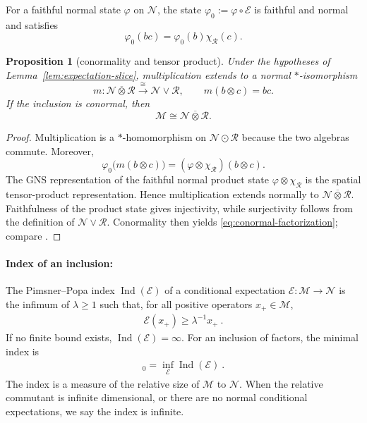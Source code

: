 \documentclass[a4paper,11pt]{article}
\newtheorem{proposition}[theorem]{Proposition}
\theoremstyle{definition}
\newcommand{\mR}{\mathcal{R}}
\newcommand{\mN}{\mathcal{N}}
\newcommand{\mM}{\mathcal{M}}
\newcommand{\mE}{\mathcal{E}}
\begin{document}
For a faithful normal state $\varphi$ on $\mN$, the state
$\varphi_0:=\varphi\circ \mE$ is faithful and normal and satisfies
\begin{equation}
 \varphi_0(b c)=\varphi_0(b)\chi_{\mR}(c).
\end{equation}

\begin{proposition}[conormality and tensor product]\label{prop:conormal-factorization}
Under the hypotheses of Lemma~\ref{lem:expectation-slice}, multiplication
extends to a normal $*$-isomorphism
\begin{equation}
 m:\mN\overline\otimes\mR
 \overset{\cong}{\longrightarrow}\mN\vee\mR,
 \qquad m(b\otimes c)=b c.
\end{equation}
If the inclusion is conormal, then
\begin{equation}\label{eq:conormal-factorization}
\mM\cong
 \mN\overline\otimes\mR .
\end{equation}
\end{proposition}

\begin{proof}
Multiplication is a $*$-homomorphism on $\mN\odot\mR$ because
the two algebras commute.  Moreover,
\begin{equation}
 \varphi_0\bigl(m(b\otimes c)\bigr)
 =(\varphi\otimes\chi_{\mR})(b\otimes c).
\end{equation}
The GNS representation of the faithful normal product state
$\varphi\otimes\chi_{\mR}$ is the spatial tensor-product representation.  Hence
multiplication extends normally to $\mN\overline\otimes\mR$.
Faithfulness of the product state gives injectivity, while surjectivity follows
from the definition of $\mN\vee\mR$.  Conormality then yields
\eqref{eq:conormal-factorization}; compare
\cite{Faulkner2020,FaulknerSperanza2024}.
\end{proof}

\paragraph{Index of an inclusion:} The Pimsner--Popa index $\operatorname{Ind}(\mE)$ of a conditional expectation $\mE:\mM\to \mN$ is the infimum of $\lambda\geq1$ such that, for all positive operators $x_+\in\mM$,
\begin{align}
    \mE(x_+)\geq \lambda^{-1}x_+\ .
\end{align}
If no finite bound exists, $\operatorname{Ind}(\mE)=\infty$. For an inclusion of factors, the minimal index is
\begin{align}
    [\mM:\mN]_0=\inf_\mE \operatorname{Ind}(\mE)\ .
\end{align}
The index is a measure of the relative size of $\mM$ to $\mN$. When the relative commutant is infinite dimensional, or there are no normal conditional expectations, we say the index is infinite.
\end{document}
